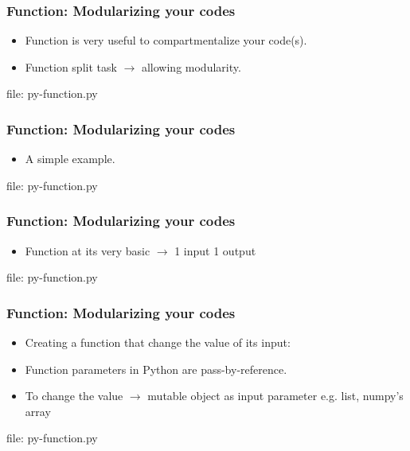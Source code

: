 \begin{frame}[fragile]
\frametitle{Function: Modularizing your codes}
\newcommand{\newfilename}{py-function.py}
\begin{itemize}
\item Function is very useful to compartmentalize your code(s).
\item Function split task $\longrightarrow$ allowing modularity.
\end{itemize}


file: \newfilename
\end{frame}


\begin{frame}[fragile]
\frametitle{Function: Modularizing your codes}
\newcommand{\newfilename}{py-function.py}
\begin{itemize}
\item A simple example.
\end{itemize}


file: \newfilename
\end{frame}


\begin{frame}[fragile]
\frametitle{Function: Modularizing your codes}
\newcommand{\newfilename}{py-function.py}
\begin{itemize}
\item Function at its very basic $\longrightarrow$ 1 input 1 output
\end{itemize}


file: \newfilename
\end{frame}


\begin{frame}[fragile]
\frametitle{Function: Modularizing your codes}
\newcommand{\newfilename}{py-function.py}
\begin{itemize}
\item Creating a function that change the value of its input: 



\item Function parameters in Python are pass-by-reference.
\item To change the value $\longrightarrow$ mutable object as input parameter e.g. list, numpy's array

\end{itemize}

file: \newfilename
\end{frame}

